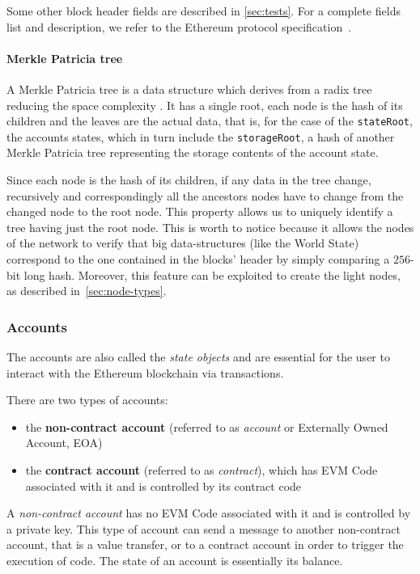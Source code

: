 Some other block header fields are described in \autoref{sec:tests}. For a
complete fields list and description, we refer to the Ethereum protocol
specification~\cite{wood2018ethereum}.

\paragraph{Merkle Patricia tree} A Merkle Patricia tree is a data structure
which derives from a radix tree reducing the space complexity
\cite{patriciatree}. It has a single root, each node is the hash of its children
and the leaves are the actual data, that is, for the case of the
\verb+stateRoot+, the accounts states, which in turn include the
\verb+storageRoot+, a hash of another Merkle Patricia tree representing the
storage contents of the account state.

Since each node is the hash of its children, if any data in the tree change,
recursively and correspondingly all the ancestors nodes have to change from the
changed node to the root node. This property allows us to uniquely identify a
tree having just the root node. This is worth to notice because it allows the
nodes of the network to verify that big data-structures (like the World State)
correspond to the one contained in the blocks' header by simply comparing a
$256$-bit long hash. Moreover, this feature can be exploited to create the light
nodes, as described in~\autoref{sec:node-types}.


\subsubsection{Accounts}
\label{sec:accounts}

The accounts are also called the \emph{state objects} and are essential for the
user to interact with the Ethereum blockchain via transactions.

There are two types of accounts:

\begin{itemize}
  \item the \textbf{non-contract account} (referred to as \emph{account} or
  Externally Owned Account, EOA)
  \item the \textbf{contract account} (referred to as \emph{contract}), which
  has EVM Code associated with it and is controlled by its contract code
\end{itemize}

A \emph{non-contract account} has no EVM Code associated with it and is
controlled by a private key. This type of account can send a message to another
non-contract account, that is a value transfer, or to a contract account in
order to trigger the execution of code. The state of an account is essentially
its balance.

